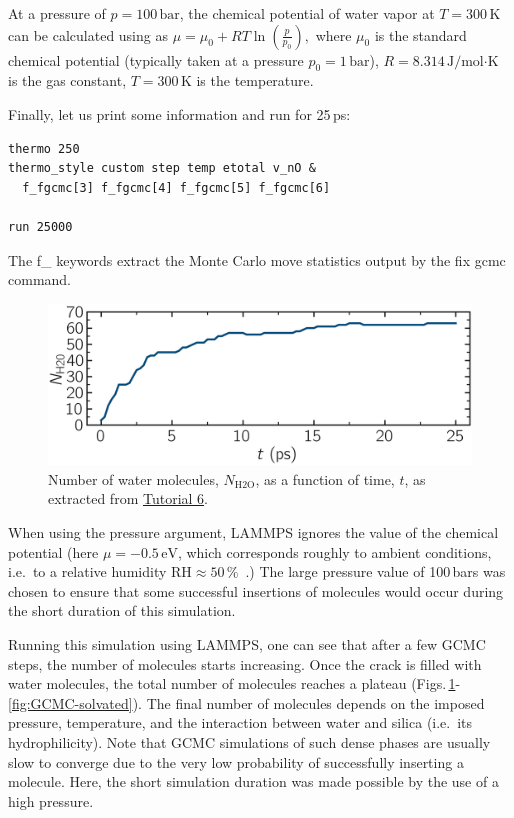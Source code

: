 \documentclass[9pt,tutorial]{livecoms}
\newcommand{\lmpcmd}[1]{\hspace{0pt}\colorbox{listing}{\textcolor{command}{\small{#1}}}\hspace{0pt}} %
\begin{document}
\begin{note}
At a pressure of $p = 100\,\text{bar}$, the chemical potential of water vapor at $T = 300\,\text{K}$
can be calculated using as $\mu = \mu_0 + RT \ln (\frac{p}{p_0}),$ where $\mu_0$ is the standard
chemical potential (typically taken at a pressure $p_0 = 1 \, \text{bar}$), $R = 8.314\, \text{J/mol·K}$
is the gas constant, $T = 300\,\text{K}$ is the temperature.
\end{note}

Finally, let us print some information and run for 25\,ps:
\begin{lstlisting}
thermo 250
thermo_style custom step temp etotal v_nO &
  f_fgcmc[3] f_fgcmc[4] f_fgcmc[5] f_fgcmc[6]

run 25000
\end{lstlisting}
{\color{blue}The \lmpcmd{f\_} keywords extract the Monte Carlo move statistics 
output by the \lmpcmd{fix gcmc} command.}

\begin{figure}
\centering
\includegraphics[width=\linewidth]{GCMC-number}
\caption{Number of water molecules, $N_\text{H2O}$, as a function of time, $t$,
as extracted from \hyperref[gcmc-silica-label]{Tutorial 6}.}
\label{fig:GCMC-number}
\end{figure}

\begin{note}
When using the pressure argument, LAMMPS ignores the value of the
chemical potential (here $\mu = -0.5\,\text{eV}$, which corresponds roughly to
ambient conditions, i.e.~to a relative humidity $\text{RH} \approx 50\,\%$~\cite{gravelle2020multi}.)
The large pressure value of 100\,bars was chosen to ensure that some successful
insertions of molecules would occur during the short duration of this simulation.
\end{note}

Running this simulation using LAMMPS, one can see that
after a few GCMC steps, the number of molecules starts increasing.  Once the
crack is filled with water molecules, the total number of molecules reaches a plateau
(Figs.\,\ref{fig:GCMC-number}-\ref{fig:GCMC-solvated}).  The final number of
molecules depends on the imposed pressure, temperature, and the interaction
between water and silica (i.e.~its hydrophilicity).  Note that GCMC simulations
of such dense phases are usually slow to converge due to the very low probability
of successfully inserting a molecule.  Here, the short simulation duration was
made possible by the use of a high pressure.
\end{document}
